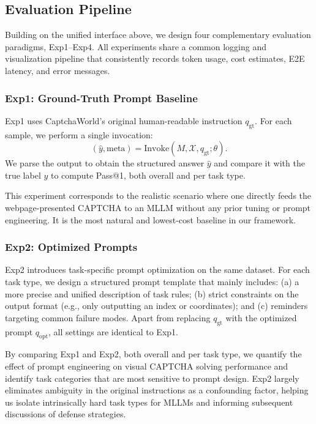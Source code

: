 \documentclass[sigconf, review]{acmart}
\begin{document}
\subsection{Evaluation Pipeline}
\label{subsec:pipeline}

Building on the unified interface above, we design four complementary evaluation paradigms, Exp1--Exp4. All experiments share a common logging and visualization pipeline that consistently records token usage, cost estimates, E2E latency, and error messages.

\subsubsection{Exp1: Ground-Truth Prompt Baseline}

Exp1 uses CaptchaWorld’s original human-readable instruction $q_{\text{gt}}$. For each sample, we perform a single invocation:
\begin{equation}
  (\hat{y}, \mathrm{meta}) = \mathrm{Invoke}(M, \mathcal{X}, q_{\text{gt}}; \theta).
\end{equation}
We parse the output to obtain the structured answer $\hat{y}$ and compare it with the true label $y$ to compute Pass@1, both overall and per task type.

This experiment corresponds to the realistic scenario where one directly feeds the webpage-presented CAPTCHA to an MLLM without any prior tuning or prompt engineering. It is the most natural and lowest-cost baseline in our framework.

\subsubsection{Exp2: Optimized Prompts}

Exp2 introduces task-specific prompt optimization on the same dataset. For each task type, we design a structured prompt template that mainly includes: (a) a more precise and unified description of task rules; (b) strict constraints on the output format (e.g., only outputting an index or coordinates); and (c) reminders targeting common failure modes. Apart from replacing $q_{\text{gt}}$ with the optimized prompt $q_{\text{opt}}$, all settings are identical to Exp1.

By comparing Exp1 and Exp2, both overall and per task type, we quantify the effect of prompt engineering on visual CAPTCHA solving performance and identify task categories that are most sensitive to prompt design. Exp2 largely eliminates ambiguity in the original instructions as a confounding factor, helping us isolate intrinsically hard task types for MLLMs and informing subsequent discussions of defense strategies.
\end{document}
